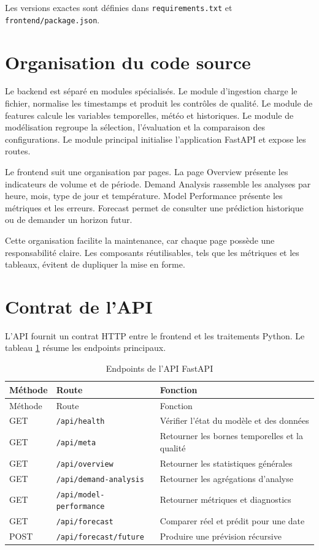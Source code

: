 \documentclass[12pt,a4paper]{report}
\begin{document}
Les versions exactes sont définies dans \texttt{requirements.txt} et
\texttt{frontend/package.json}.

\section{Organisation du code source}

Le backend est séparé en modules spécialisés. Le module d'ingestion charge le
fichier, normalise les timestamps et produit les contrôles de qualité. Le
module de features calcule les variables temporelles, météo et historiques.
Le module de modélisation regroupe la sélection, l'évaluation et la
comparaison des configurations. Le module principal initialise l'application
FastAPI et expose les routes.

Le frontend suit une organisation par pages. La page Overview présente les
indicateurs de volume et de période. Demand Analysis rassemble les analyses
par heure, mois, type de jour et température. Model Performance présente les
métriques et les erreurs. Forecast permet de consulter une prédiction
historique ou de demander un horizon futur.

Cette organisation facilite la maintenance, car chaque page possède une
responsabilité claire. Les composants réutilisables, tels que les métriques et
les tableaux, évitent de dupliquer la mise en forme.

\section{Contrat de l'API}

L'API fournit un contrat HTTP entre le frontend et les traitements Python. Le
tableau \ref{tab:endpoints-api} résume les endpoints principaux.

\begin{longtable}{p{} p{} p{}}
\caption{Endpoints de l'API FastAPI}\label{tab:endpoints-api}\\
\toprule
Méthode & Route & Fonction \\
\midrule
\endfirsthead
\toprule
Méthode & Route & Fonction \\
\midrule
\endhead
GET & \texttt{/api/health} & Vérifier l'état du modèle et des données \\
GET & \texttt{/api/meta} & Retourner les bornes temporelles et la qualité \\
GET & \texttt{/api/overview} & Retourner les statistiques générales \\
GET & \texttt{/api/demand-analysis} & Retourner les agrégations d'analyse \\
GET & \texttt{/api/model-performance} & Retourner métriques et diagnostics \\
GET & \texttt{/api/forecast} & Comparer réel et prédit pour une date \\
POST & \texttt{/api/forecast/future} & Produire une prévision récursive \\
\bottomrule
\end{longtable}
\end{document}
